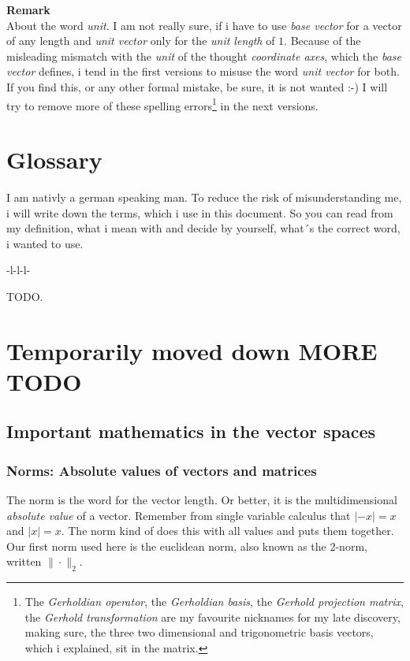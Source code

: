 \documentclass[a4paper]{article}
\begin{document}
\textbf{Remark}\\
About the word \emph{unit}. I am not really sure, if i have to use \emph{base vector} for a vector of any length and \emph{unit vector} only for the \emph{unit length} of $1$. Because of the misleading mismatch with the \emph{unit} of the thought \emph{coordinate axes}, which the \emph{base vector} defines, i tend in the first versions to misuse the word \emph{unit vector} for both. If you find this, or any other formal mistake, be sure, it is not wanted :-) I will try to remove more of these spelling errors\footnote{The \emph{Gerholdian operator}, the \emph{Gerholdian basis}, the \emph{Gerhold projection matrix}, the \emph{Gerhold transformation} are my favourite nicknames for my late discovery, making sure, the three two dimensional and trigonometric basis vectors, which i explained, sit in the matrix.} in the next versions.
\section{Glossary}

I am nativly a german speaking man. To reduce the risk of misunderstanding me, i will write down the terms, which i use in this document. So you can read from my definition, what i mean with and decide by yourself, what´s the correct word, i wanted to use.\\



\begin{tabular}{-l-l-l-}

\end{tabular}

TODO.

\appendix


\section{Temporarily moved down MORE TODO}

\subsection{Important mathematics in the vector spaces}

\subsubsection{Norms: Absolute values of vectors and matrices}

The norm is the word for the vector length. Or better, it is the multidimensional \emph{absolute value} of a vector. Remember from single variable calculus that $|-x|=x$ and $|x|=x$. The norm kind of does this with all values and puts them together.
Our first norm used here is the euclidean norm, also known as the 2-norm, written $\|\cdot\|_{2}$. \\
\end{document}
